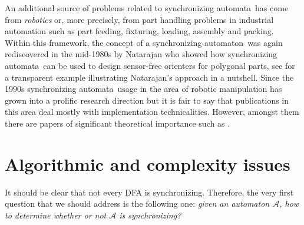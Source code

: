 \documentclass{irmaart}
\newcommand{\sa}{synchronizing au\-tom\-a\-ta}
\newcommand{\san}{synchronizing au\-tom\-a\-ton}
\begin{document}
An additional source of problems related to \sa\ has come from
\emph{robotics} or, more precisely, from part handling problems
in industrial automation such as part feeding, fixturing, loading,
assembly and packing. Within this framework, the concept of a \san\
was again rediscovered in the mid-1980s by Natarajan \cite{Natarajan:1986,
Natarajan:1989} who showed how \sa\ can be used to design sensor-free
orienters for polygonal parts, see \cite[Section~1]{Volkov:2008} for
a transparent example illustrating Natarajan's approach in a nutshell.
Since the 1990s \sa\ usage in the area of robotic manipulation has grown
into a prolific research direction but it is fair to say that publications
in this area deal mostly with implementation technicalities. However,
amongst them there are papers of significant theoretical importance
such as \cite{Eppstein:1990,Goldberg:1993,Chen&Ierardi:1995}.

\section{Algorithmic and complexity issues}

It should be clear that not every DFA is synchronizing. Therefore,
the very first question that we should address is the following
one: \emph{given an automaton $\mathcal{A}$, how to determine
whether or not $\mathcal{A}$ is synchronizing?}
\end{document}
